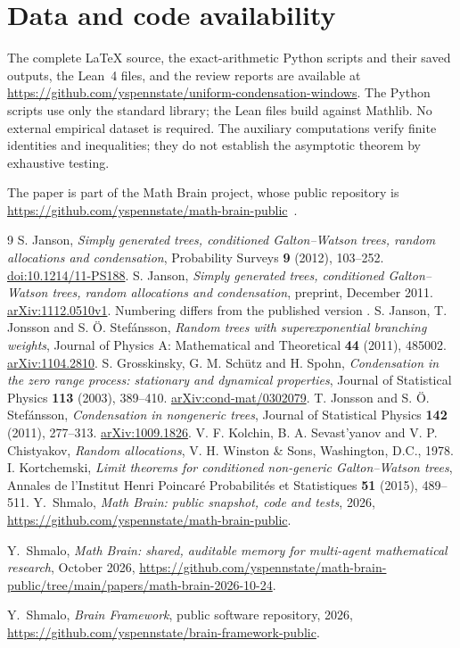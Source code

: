 \documentclass[11pt]{amsart}
\theoremstyle{remark}\newtheorem{remark}[theorem]{Remark}
\begin{document}
\section*{Data and code availability}
The complete \LaTeX{} source, the exact-arithmetic Python scripts and their
saved outputs, the Lean~4 files, and the review reports are available at
\url{https://github.com/yspennstate/uniform-condensation-windows}. The Python
scripts use only the standard library; the Lean files build against Mathlib.
No external empirical dataset is required. The auxiliary computations verify
finite identities and inequalities; they do not establish the asymptotic
theorem by exhaustive testing.

The paper is part of the Math Brain project, whose public repository is \url{https://github.com/yspennstate/math-brain-public}~\cite{MathBrainRepo}.

\begin{thebibliography}{9}
S. Janson,
\emph{Simply generated trees, conditioned Galton--Watson trees, random
allocations and condensation},
Probability Surveys \textbf{9} (2012), 103--252.
\href{https://doi.org/10.1214/11-PS188}{doi:10.1214/11-PS188}.
S. Janson,
\emph{Simply generated trees, conditioned Galton--Watson trees, random
allocations and condensation}, preprint, December 2011.
\href{https://arxiv.org/abs/1112.0510v1}{arXiv:1112.0510v1}.
Numbering differs from the published version \cite{Janson}.
S. Janson, T. Jonsson and S. \"O. Stef\'ansson,
\emph{Random trees with superexponential branching weights},
Journal of Physics A: Mathematical and Theoretical \textbf{44} (2011), 485002.
\href{https://arxiv.org/abs/1104.2810}{arXiv:1104.2810}.
S. Grosskinsky, G. M. Sch\"utz and H. Spohn,
\emph{Condensation in the zero range process: stationary and dynamical
properties}, Journal of Statistical Physics \textbf{113} (2003), 389--410.
\href{https://arxiv.org/abs/cond-mat/0302079}{arXiv:cond-mat/0302079}.
T. Jonsson and S. \"O. Stef\'ansson,
\emph{Condensation in nongeneric trees},
Journal of Statistical Physics \textbf{142} (2011), 277--313.
\href{https://arxiv.org/abs/1009.1826}{arXiv:1009.1826}.
V. F. Kolchin, B. A. Sevast'yanov and V. P. Chistyakov,
\emph{Random allocations}, V. H. Winston \& Sons, Washington, D.C., 1978.
I. Kortchemski,
\emph{Limit theorems for conditioned non-generic Galton--Watson trees},
Annales de l'Institut Henri Poincar\'e Probabilit\'es et Statistiques
\textbf{51} (2015), 489--511.
 Y.~Shmalo, \emph{Math Brain: public snapshot, code and tests}, 2026, \url{https://github.com/yspennstate/math-brain-public}.

 Y.~Shmalo, \emph{Math Brain: shared, auditable memory for multi-agent mathematical research}, October 2026, \url{https://github.com/yspennstate/math-brain-public/tree/main/papers/math-brain-2026-10-24}.

 Y.~Shmalo, \emph{Brain Framework}, public software repository, 2026, \url{https://github.com/yspennstate/brain-framework-public}.

\end{thebibliography}
\end{document}
